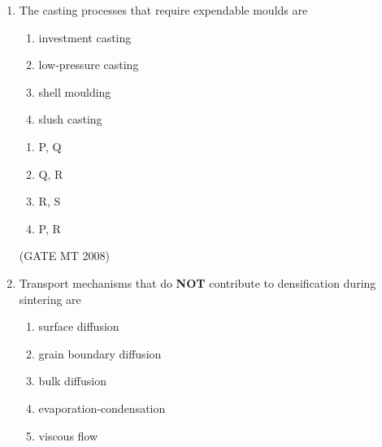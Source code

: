 \documentclass[journal, 11pt, onecolumn]{IEEEtran}
\theoremstyle{remark}
\begin{document}
\begin{enumerate}
\begin{enumerate}[label=(\MakeUppercase{\alph*}), start= 16]
\item The reaction will shift to left on increasing T
\item The reaction will shift to right on increasing T
\item The reaction will shift to left on increasing pressure
\item The reaction will shift to right on increasing pressure
\end{enumerate}

\begin{multicols}{2}
\begin{enumerate} 
\item P, S
\item P, Q
\item Q, R
\item R, S
\end{enumerate}
\end{multicols}
\hfill(GATE MT 2008)

\item The casting processes that require expendable moulds are
\begin{multicols}{1}
\begin{enumerate}[label=(\MakeUppercase{\alph*}), start= 16]
\item investment casting
\item low-pressure casting
\item shell moulding
\item slush casting
\end{enumerate}
\end{multicols}

\begin{multicols}{2}
\begin{enumerate} 
\item P, Q
\item Q, R
\item R, S
\item P, R
\end{enumerate}
\end{multicols}
\hfill(GATE MT 2008)
\item Transport mechanisms that do \textbf{NOT} contribute to densification during sintering are
\begin{enumerate}[label=(\MakeUppercase{\alph*}), start= 16]
\item surface diffusion
\item grain boundary diffusion
\item bulk diffusion
\item evaporation-condensation
\item viscous flow
\end{enumerate}


\end{enumerate}
\end{document}
